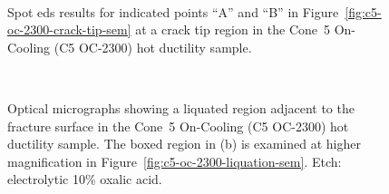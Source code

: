 {\begin{figure}
    \centering
     \\
    \caption{Spot \gls{eds} results for indicated points ``A'' and ``B'' in Figure~\ref{fig:c5-oc-2300-crack-tip-sem} at a crack tip region in the Cone~5 On-Cooling \protect{} (C5 OC-2300) hot ductility sample.}
    \label{fig:c5-oc-2300-crack-tip-eds}
\end{figure}


\begin{figure}
    \centering
     \\
    \caption{Optical micrographs showing a liquated region adjacent to the fracture surface in the Cone~5 On-Cooling \protect{} (C5 OC-2300) hot ductility sample. The boxed region in (b) is examined at higher magnification in Figure~\ref{fig:c5-oc-2300-liquation-sem}. Etch: electrolytic 10\% oxalic acid.}
    \label{fig:c5-oc-2300-liquation-olm}
\end{figure}

}
